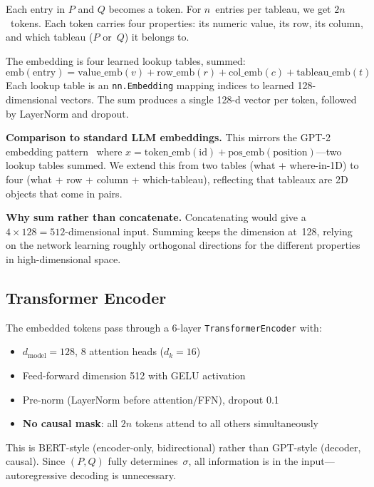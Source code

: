 \documentclass[11pt,a4paper]{article}
\begin{document}
Each entry in $P$ and $Q$ becomes a token. For $n$~entries per tableau, we get $2n$~tokens. Each token carries four properties: its numeric value, its row, its column, and which tableau ($P$ or~$Q$) it belongs to.

The embedding is four learned lookup tables, summed:
\begin{equation}
\mathrm{emb}(\text{entry}) = \mathrm{value\_emb}(v) + \mathrm{row\_emb}(r) + \mathrm{col\_emb}(c) + \mathrm{tableau\_emb}(t)
\end{equation}
Each lookup table is an \texttt{nn.Embedding} mapping indices to learned 128-dimensional vectors. The sum produces a single 128-d vector per token, followed by LayerNorm and dropout.

\textbf{Comparison to standard LLM embeddings.} This mirrors the GPT-2 embedding pattern~\cite{raschka2024} where $x = \mathrm{token\_emb}(\text{id}) + \mathrm{pos\_emb}(\text{position})$---two lookup tables summed. We extend this from two tables (what + where-in-1D) to four (what + row + column + which-tableau), reflecting that tableaux are 2D objects that come in pairs.

\textbf{Why sum rather than concatenate.} Concatenating would give a $4 \times 128 = 512$-dimensional input. Summing keeps the dimension at~128, relying on the network learning roughly orthogonal directions for the different properties in high-dimensional space.

\subsection{Transformer Encoder}

The embedded tokens pass through a 6-layer \texttt{TransformerEncoder} with:
\begin{itemize}[nosep]
    \item $d_{\text{model}} = 128$, 8 attention heads ($d_k = 16$)
    \item Feed-forward dimension 512 with GELU activation
    \item Pre-norm (LayerNorm before attention/FFN), dropout 0.1
    \item \textbf{No causal mask}: all $2n$ tokens attend to all others simultaneously
\end{itemize}

This is BERT-style (encoder-only, bidirectional) rather than GPT-style (decoder, causal). Since $(P, Q)$ fully determines~$\sigma$, all information is in the input---autoregressive decoding is unnecessary.
\end{document}
